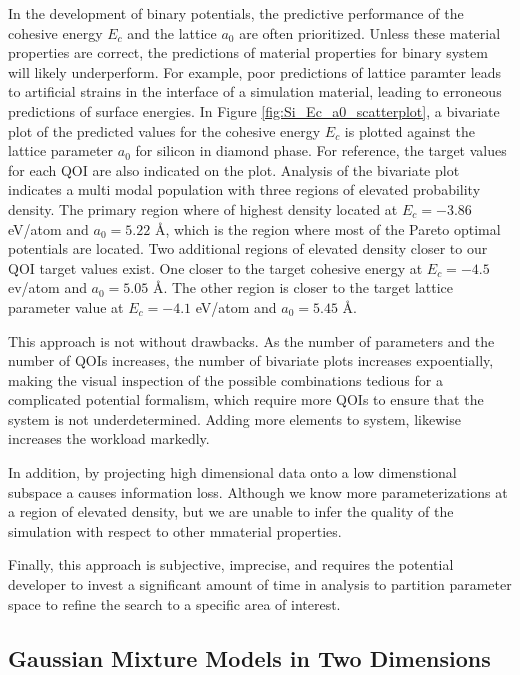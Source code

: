 In the development of binary potentials, the predictive performance of the cohesive energy $E_c$ and the lattice $a_0$ are often prioritized.  Unless these material properties are correct, the predictions of material properties for binary system will likely underperform.  For example, poor predictions of lattice paramter leads to artificial strains in the interface of a simulation material, leading to erroneous predictions of surface energies.  In Figure \ref{fig:Si_Ec_a0_scatterplot}, a bivariate plot of the predicted values for the cohesive energy $E_c$ is plotted against the lattice parameter $a_0$ for silicon in diamond phase.
For reference, the target values for each QOI are also indicated on the plot.  Analysis of the bivariate plot indicates a multi modal population with three regions of elevated probability density.
The primary region where of highest density located at $E_c=-3.86$ eV/atom and $a_0=5.22$ \AA, which is the region where most of the Pareto optimal potentials are located.  Two additional regions of elevated density closer to our QOI target values exist.  One closer to the target cohesive energy at $E_c=-4.5$ ev/atom and $a_0=5.05$ \AA.  The other region is closer to the target lattice parameter value at $E_c=-4.1$ eV/atom and $a_0=5.45$ \AA.

This approach is not without drawbacks.  As the number of parameters and the number of QOIs increases, the number of bivariate plots increases expoentially, making the visual inspection of the possible combinations tedious for a complicated potential formalism, which require more QOIs to ensure that the system is not underdetermined.  Adding more elements to system, likewise increases the workload markedly.

In addition, by projecting high dimensional data onto a low dimenstional subspace a causes information loss.  Although we know more parameterizations at a region of elevated density, but we are unable to infer the quality of the simulation with respect to other mmaterial properties.

Finally, this approach is subjective, imprecise, and requires the potential developer to invest a significant amount of time in analysis to partition parameter space to refine the search to a specific area of interest.

\subsection{Gaussian Mixture Models in Two Dimensions}

